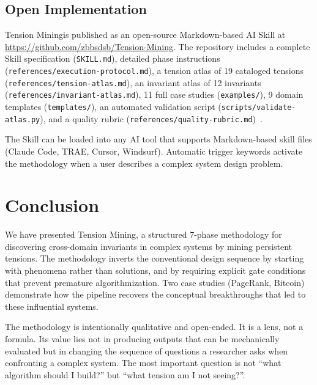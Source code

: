 \documentclass[11pt,a4paper]{article}
\newcommand{\methodname}{Tension Mining}
\begin{document}
\subsection{Open Implementation}

\methodname is published as an open-source Markdown-based AI Skill at \url{https://github.com/zbbsdsb/Tension-Mining}. The repository includes a complete Skill specification (\texttt{SKILL.md}), detailed phase instructions (\texttt{references/execution-protocol.md}), a tension atlas of 19 cataloged tensions (\texttt{references/tension-atlas.md}), an invariant atlas of 12 invariants (\texttt{references/invariant-atlas.md}), 11 full case studies (\texttt{examples/}), 9 domain templates (\texttt{templates/}), an automated validation script (\texttt{scripts/validate-atlas.py}), and a quality rubric (\texttt{references/quality-rubric.md})~\cite{knowls_repo}.

The Skill can be loaded into any AI tool that supports Markdown-based skill files (Claude Code, TRAE, Cursor, Windsurf). Automatic trigger keywords activate the methodology when a user describes a complex system design problem.

\section{Conclusion}
\label{sec:conclusion}

We have presented \methodname, a structured 7-phase methodology for discovering cross-domain invariants in complex systems by mining persistent tensions. The methodology inverts the conventional design sequence by starting with phenomena rather than solutions, and by requiring explicit gate conditions that prevent premature algorithmization. Two case studies (PageRank, Bitcoin) demonstrate how the pipeline recovers the conceptual breakthroughs that led to these influential systems.

The methodology is intentionally qualitative and open-ended. It is a lens, not a formula. Its value lies not in producing outputs that can be mechanically evaluated but in changing the sequence of questions a researcher asks when confronting a complex system. The most important question is not ``what algorithm should I build?'' but ``what tension am I not seeing?''.


\end{document}
